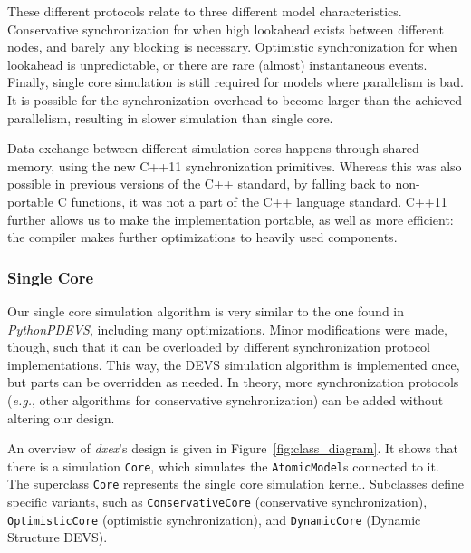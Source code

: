 These different protocols relate to three different model characteristics.
Conservative synchronization for when high lookahead exists between different nodes, and barely any blocking is necessary.
Optimistic synchronization for when lookahead is unpredictable, or there are rare (almost) instantaneous events.
Finally, single core simulation is still required for models where parallelism is bad. 
It is possible for the synchronization overhead to become larger than the achieved parallelism, resulting in slower simulation than single core.

Data exchange between different simulation cores happens through shared memory, using the new C++11 synchronization primitives.
Whereas this was also possible in previous versions of the C++ standard, by falling back to non-portable C functions, it was not a part of the C++ language standard.
C++11 further allows us to make the implementation portable, as well as more efficient: the compiler makes further optimizations to heavily used components.

\subsubsection{Single Core}
Our single core simulation algorithm is very similar to the one found in \textit{PythonPDEVS}, including many optimizations.
Minor modifications were made, though, such that it can be overloaded by different synchronization protocol implementations.
This way, the \textsf{DEVS} simulation algorithm is implemented once, but parts can be overridden as needed.
In theory, more synchronization protocols (\textit{e.g.}, other algorithms for conservative synchronization) can be added without altering our design.

An overview of \textit{dxex}'s design is given in Figure~\ref{fig:class_diagram}.
It shows that there is a simulation \texttt{Core}, which simulates the \texttt{AtomicModel}s connected to it.
The superclass \texttt{Core} represents the single core simulation kernel.
Subclasses define specific variants, such as \texttt{ConservativeCore} (conservative synchronization), \texttt{OptimisticCore} (optimistic synchronization), and \texttt{DynamicCore} (\textsf{Dynamic Structure DEVS}).

